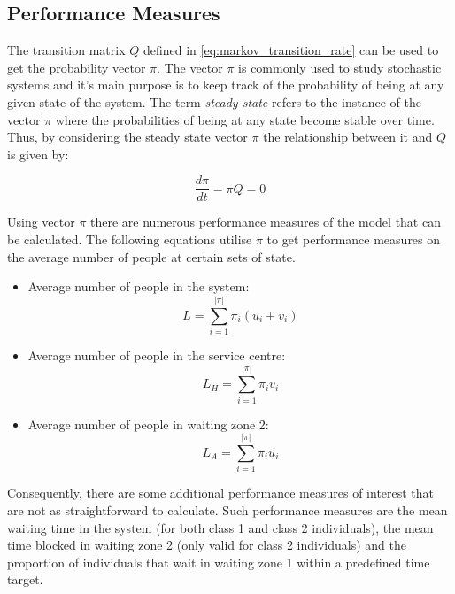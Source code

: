 \subsection{Performance Measures}


The transition matrix \( Q \) defined in \ref{eq:markov_transition_rate} can be 
used to get the probability vector \( \pi \).
The vector \( \pi \) is commonly used to study stochastic systems and it's main
purpose is to keep track of the probability of being at any given state of 
the system.
The term \textit{steady state} refers to the instance of the vector \( \pi \) 
where the probabilities of being at any state become stable over time. 
Thus, by considering the steady state vector \( \pi \) the relationship between 
it and \( Q \) is given by:

\[
    \frac{d\pi}{dt} = \pi Q = 0
\]

Using vector \(\pi\) there are numerous performance measures of the model that 
can be calculated. 
The following equations utilise \(\pi\) to get performance measures on the 
average number of people at certain sets of state.

\begin{itemize}
    \item Average number of people in the system: 
        \[L = \sum_{i=1}^{|\pi|} \pi_i (u_i + v_i)\]
    \item Average number of people in the service centre: 
        \[L_H = \sum_{i=1}^{|\pi|} \pi_i v_i\]
    \item Average number of people in waiting zone 2:
        \[L_A = \sum_{i=1}^{|\pi|} \pi_i u_i\] 
\end{itemize}

Consequently, there are some additional performance measures of interest that
are not as straightforward to calculate.
Such performance measures are the mean waiting time in the system (for both 
class 1 and class 2 individuals), the mean time blocked in waiting zone 2 (only 
valid for class 2 individuals) and the proportion of individuals that wait in 
waiting zone 1 within a predefined time target.





% 